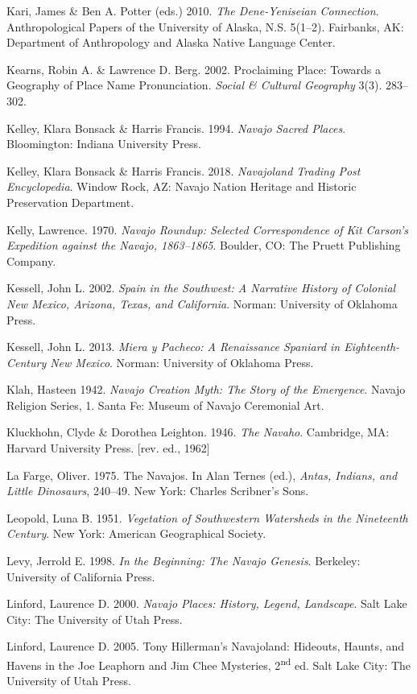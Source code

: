 \begin{hang}
	Kari, James \& Ben A. Potter (eds.)  2010. \textit{The Dene-Yeniseian Connection}.  Anthropological Papers of the University of Alaska, N.S. 5(1--2).  Fairbanks, AK:  Department of Anthropology and Alaska Native Language Center.

	Kearns, Robin A. \& Lawrence D. Berg. 2002.  Proclaiming Place: Towards a Geography of Place Name Pronunciation.  \textit{Social \& Cultural Geography} 3(3). 283--302.

	Kelley, Klara Bonsack \& Harris Francis. 1994. \textit{Navajo Sacred Places}.  Bloomington:  Indiana University Press.

	Kelley, Klara Bonsack \& Harris Francis. 2018. \textit{Navajoland Trading Post Encyclopedia}. Window Rock, AZ: Navajo Nation Heritage and Historic Preservation Department.

	Kelly, Lawrence. 1970. \textit{Navajo Roundup: Selected Correspondence of Kit Carson’s Expedition against the Navajo, 1863--1865}.  Boulder, CO:  The Pruett Publishing Company.

	Kessell, John L.  2002. \textit{Spain in the Southwest: A Narrative History of Colonial New Mexico, Arizona, Texas, and California}.  Norman:  University of Oklahoma Press.



	Kessell, John L.  2013. \textit{Miera y Pacheco: A Renaissance Spaniard in Eighteenth-Century New Mexico}.  Norman:  University of Oklahoma Press.

	Klah, Hasteen  1942. \textit{Navajo Creation Myth: The Story of the Emergence}.  Navajo Religion Series, 1.  Santa Fe:  Museum of Navajo Ceremonial Art.

	Kluckhohn, Clyde \& Dorothea Leighton.  1946. \textit{The Navaho}.  Cambridge, MA:  Harvard University Press.  [rev. ed., 1962]

	La Farge, Oliver. 1975. The Navajos. In Alan Ternes (ed.), \textit{Antas, Indians, and Little Dinosaurs}, 240--49. New York: Charles Scribner's Sons.

	Leopold, Luna B.  1951. \textit{Vegetation of Southwestern Watersheds in the Nineteenth Century}.  New York:  American Geographical Society.

	Levy, Jerrold E.  1998. \textit{In the Beginning: The Navajo Genesis}.  Berkeley:  University of California Press.

	Linford, Laurence D.  2000. \textit{Navajo Places: History, Legend, Landscape}.  Salt Lake City:  The University of Utah Press.

	Linford, Laurence D.  2005.  Tony Hillerman’s Navajoland: Hideouts, Haunts, and Havens in the Joe Leaphorn and Jim Chee\textit{ }Mysteries, 2\textsuperscript{nd} ed.  Salt Lake City:  The University of Utah Press.


\end{hang}
